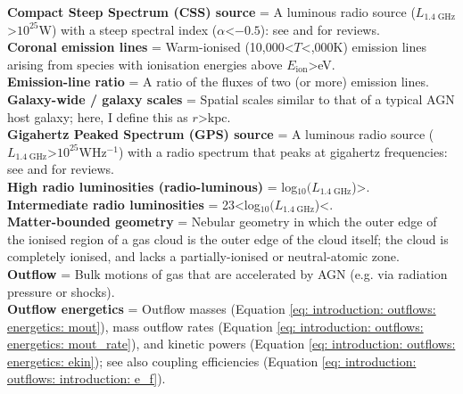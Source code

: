\vspace*{-24pt}

\textbf{Compact Steep Spectrum (CSS) source} = A luminous radio source ($L_\mathrm{1.4\;GHz}$\;\textgreater\;$10^{25}$\;W) with a steep spectral index ($\alpha$\;\textless\;$-0.5$): see \citet{ODea1998} and \citet{ODea2021} for reviews. \\

\noindent
\textbf{Coronal emission lines} = Warm-ionised (10,000\;\textless\;$T$\;\;\textless{},000\;K) emission lines arising from species with ionisation energies above $E_\mathrm{ion}$\;\textgreater{}\;eV. \\

\noindent
\textbf{Emission-line ratio} = A ratio of the fluxes of two (or more) emission lines. \\

\noindent
\textbf{Galaxy-wide / galaxy scales} = Spatial scales similar to that of a typical AGN host galaxy; here, I define this as $r$\;\textgreater{}\;kpc. \\

\noindent
\textbf{Gigahertz Peaked Spectrum (GPS) source} = A luminous radio source ($L_\mathrm{1.4\;GHz}$\;\textgreater\;$10^{25}$\;W\;Hz$^{-1}$) with a radio spectrum that peaks at gigahertz frequencies: see \citet{ODea1998} and \citet{ODea2021} for reviews. \\

\noindent
\textbf{High radio luminosities (radio-luminous)} = log$_\mathrm{10}(L_\mathrm{1.4\;GHz}$\;[W\;Hz$^{-1}$])\;\textgreater{}. \\

\noindent
\textbf{Intermediate radio luminosities} = 23\;\textless\;log$_\mathrm{10}(L_\mathrm{1.4\;GHz}$\;[W\;Hz$^{-1}$])\;\textless{}. \\

\noindent
\textbf{Matter-bounded geometry} = Nebular geometry in which the outer edge of the ionised region of a gas cloud is the outer edge of the cloud itself; the cloud is completely ionised, and lacks a partially-ionised or neutral-atomic zone. \\

\noindent
\textbf{Outflow} = Bulk motions of gas that are accelerated by AGN (e.g. via radiation pressure or shocks). \\

\noindent
\textbf{Outflow energetics} = Outflow masses (Equation \ref{eq: introduction: outflows: energetics: mout}), mass outflow rates (Equation \ref{eq: introduction: outflows: energetics: mout_rate}), and kinetic powers (Equation \ref{eq: introduction: outflows: energetics: ekin}); see also coupling efficiencies (Equation \ref{eq: introduction: outflows: introduction: e_f}). \\

